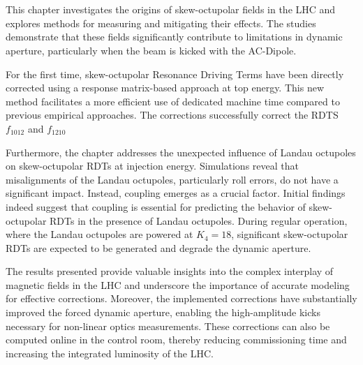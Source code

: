\FloatBarrier
\section{}

This chapter investigates the origins of skew-octupolar fields in the LHC and explores methods for
measuring and mitigating their effects. The studies demonstrate that these fields significantly
contribute to limitations in dynamic aperture, particularly when the beam is kicked with the
AC-Dipole. 

For the first time, skew-octupolar Resonance Driving Terms have been directly corrected using
a response matrix-based approach at top energy. This new method facilitates a more efficient use of
dedicated machine time compared to previous empirical approaches. The corrections successfully
correct the RDTS $f_{1012}$ and $f_{1210}$

Furthermore, the chapter addresses the unexpected influence of Landau octupoles on skew-octupolar
RDTs at injection energy. Simulations reveal that misalignments of the Landau octupoles,
particularly roll errors, do not have a significant impact. Instead, coupling emerges as a crucial
factor.
Initial findings indeed suggest that coupling is essential for predicting the behavior of
skew-octupolar RDTs in the presence of Landau octupoles. During regular operation, where the Landau
octupoles are powered at $K_4 = 18$, significant skew-octupolar RDTs are expected to be generated
and degrade the dynamic aperture.

The results presented provide valuable insights into the complex interplay of magnetic fields in the
LHC and underscore the importance of accurate modeling for effective corrections. Moreover, the
implemented corrections have substantially improved the forced dynamic aperture, enabling the
high-amplitude kicks necessary for non-linear optics measurements. These corrections can also be
computed online in the control room, thereby reducing commissioning time and increasing the
integrated luminosity of the LHC.